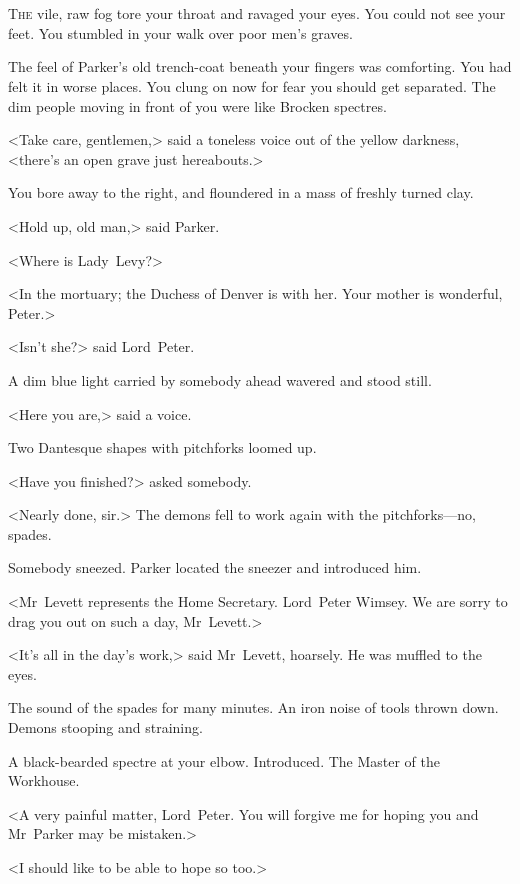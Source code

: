 \chapter[Chapter \thechapter]{}
\lettrine[lines=4]{T}{he} vile, raw fog tore your throat and ravaged your eyes. You could not see your feet. You stumbled in your walk over poor men's graves.

\zz
The feel of Parker's old trench-coat beneath your fingers was comforting. You had felt it in worse places. You clung on now for fear you should get separated. The dim people moving in front of you were like Brocken spectres.

<Take care, gentlemen,> said a toneless voice out of the yellow darkness, <there's an open grave just hereabouts.>

You bore away to the right, and floundered in a mass of freshly turned clay.

<Hold up, old man,> said Parker.

<Where is Lady~Levy?>

<In the mortuary; the Duchess of Denver is with her. Your mother is wonderful, Peter.>

<Isn't she?> said Lord~Peter.

A dim blue light carried by somebody ahead wavered and stood still.

<Here you are,> said a voice.

Two Dantesque shapes with pitchforks loomed up.

<Have you finished?> asked somebody.

<Nearly done, sir.> The demons fell to work again with the pitchforks—no, spades.

Somebody sneezed. Parker located the sneezer and introduced him.

<Mr~Levett represents the Home Secretary. Lord~Peter Wimsey. We are sorry to drag you out on such a day, Mr~Levett.>

<It's all in the day's work,> said Mr~Levett, hoarsely. He was muffled to the eyes.

The sound of the spades for many minutes. An iron noise of tools thrown down. Demons stooping and straining.

A black-bearded spectre at your elbow. Introduced. The Master of the Workhouse.

<A very painful matter, Lord~Peter. You will forgive me for hoping you and Mr~Parker may be mistaken.>

<I should like to be able to hope so too.>

